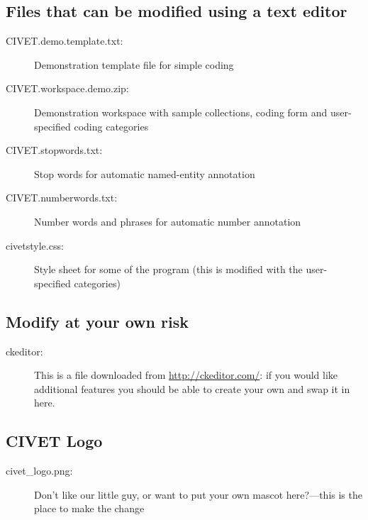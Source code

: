 \documentclass[letterpaper,10pt,english]{sphinxmanual}
\begin{document}
\subsection{Files that can be modified using a text editor}
\label{appendix3:files-that-can-be-modified-using-a-text-editor}\begin{description}
\item[{CIVET.demo.template.txt:}] \leavevmode
Demonstration template file for simple coding

\item[{CIVET.workspace.demo.zip:}] \leavevmode
Demonstration workspace with sample collections, coding form and
user-specified coding categories

\item[{CIVET.stopwords.txt:}] \leavevmode
Stop words for automatic named-entity annotation

\item[{CIVET.numberwords.txt:}] \leavevmode
Number words and phrases for automatic number annotation

\item[{civetstyle.css:}] \leavevmode
Style sheet for some of the program (this is modified with the
user-specified categories)

\end{description}


\subsection{Modify at your own risk}
\label{appendix3:modify-at-your-own-risk}\begin{description}
\item[{ckeditor:}] \leavevmode
This is a  file downloaded from
\href{http://ckeditor.com/}{http://ckeditor.com/}: if you would like additional features you
should be able to create your own and swap it in here.

\end{description}


\subsection{CIVET Logo}
\label{appendix3:civet-logo}\begin{description}
\item[{civet\_logo.png:}] \leavevmode
Don’t like our little guy, or want to put your own mascot here?—this
is the place to make the change

\end{description}
\end{document}
